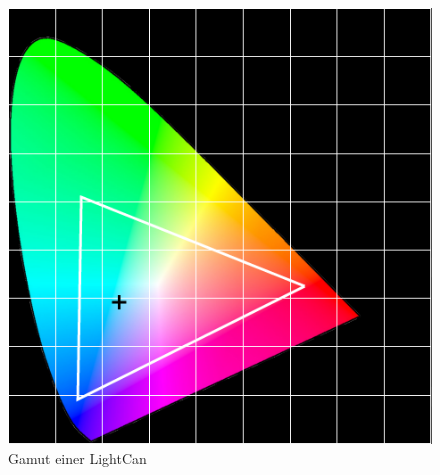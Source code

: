 \documentclass[11pt]{scrartcl}
\begin{document}
\begin{figure}[H]
    \begin{center}
        \includegraphics[width=.9\textwidth]{images/gamut_lightCan.png}
    \end{center}
    \caption{Gamut einer LightCan} \label{fig:gamutLightCan}
\end{figure}
\noindent
\end{document}
